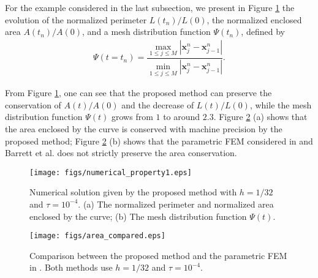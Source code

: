 \documentclass[review]{elsarticle}
\begin{document}
For the example considered in the last subsection, we present in
Figure \ref{fig:numerical_property_newton} the evolution of the normalized perimeter $L(t_{n})/L(0)$, the normalized enclosed area $A(t_{n})/A(0)$, and a mesh distribution function $\Psi(t_{n})$, defined by~\cite{Bao17}
\begin{align*}
\Psi(t=t_{n}) = \dfrac{\max\limits_{1\le j\le M}\left|\mathbf{x}_j^n - \mathbf{x}_{j - 1}^n\right|}{\min\limits_{1\le j\le M}\left|\mathbf{x}_j^n - \mathbf{x}_{j-1}^n\right|} .
\end{align*}

From Figure \ref{fig:numerical_property_newton}, one can see that the proposed method can preserve the conservation of $A(t)/A(0)$ and the decrease of $L(t)/L(0)$, while the mesh distribution function $\Psi(t)$ grows from $1$ to around $2.3$.
Figure \ref{fig:area_accurate} (a) shows that the area enclosed by the curve is conserved with machine precision by the proposed method; Figure \ref{fig:area_accurate} (b) shows that the parametric FEM considered in \cite{Bao17} and Barrett et al. \cite{Barrett07a} does not strictly preserve the area conservation.

\begin{figure}[htbp!]
    \centering
    \texttt{[image: figs/numerical\_property1.eps]}
    \vspace{-5mm}
  \caption{Numerical solution given by the proposed method with $h = 1/32$ and $\tau = 10^{-4}$. \newline
\indent\hspace{45pt}  (a) The normalized perimeter and normalized area enclosed by the curve; \newline
\indent\hspace{45pt}  (b) The mesh distribution function $\Psi(t)$.}
  \label{fig:numerical_property_newton}
\end{figure}

\begin{figure}[htp!]
\centering
\texttt{[image: figs/area\_compared.eps]}
\vspace{-5mm}
\caption{Comparison between the proposed method and the parametric FEM in \cite{Bao17}. \newline
\indent\hspace{45pt}  Both methods use $h = 1/32$ and $\tau = 10^{-4}$.} \label{fig:area_accurate}
\end{figure}
\end{document}
